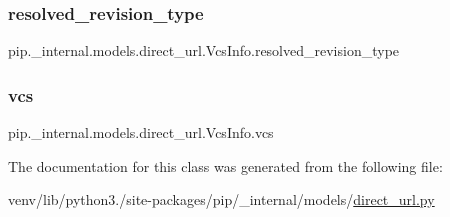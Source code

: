 \subsubsection{\texorpdfstring{resolved\+\_\+revision\+\_\+type}{resolved\_revision\_type}}
{\footnotesize\ttfamily pip.\+\_\+internal.\+models.\+direct\+\_\+url.\+Vcs\+Info.\+resolved\+\_\+revision\+\_\+type\hspace{0.3cm}{\ttfamily [static]}}

\mbox{\label{classpip_1_1__internal_1_1models_1_1direct__url_1_1VcsInfo_a9521bc8384f69befd657f9d16fbfec71}} 
\subsubsection{\texorpdfstring{vcs}{vcs}}
{\footnotesize\ttfamily pip.\+\_\+internal.\+models.\+direct\+\_\+url.\+Vcs\+Info.\+vcs\hspace{0.3cm}{\ttfamily [static]}}



The documentation for this class was generated from the following file\+:\begin{DoxyCompactItemize}
\item 
venv/lib/python3./site-\/packages/pip/\+\_\+internal/models/\hyperlink{direct__url_8py}{direct\+\_\+url.\+py}\end{DoxyCompactItemize}
